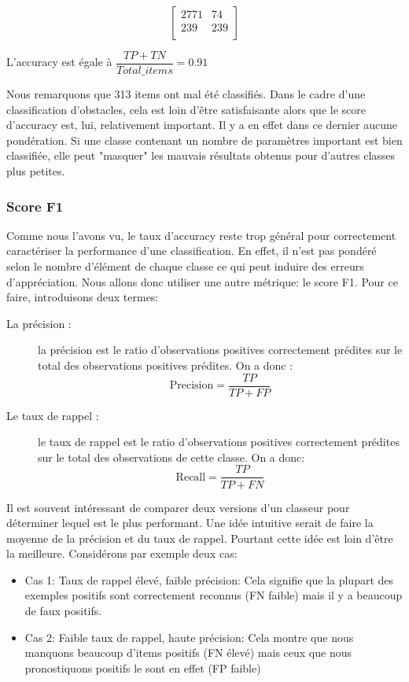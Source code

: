\documentclass[a4paper]{report}
\begin{document}
$$\begin{bmatrix}
2771 & 74 \\ 
239 & 239 \\
\end{bmatrix}$$

\medskip
L’accuracy est égale à $\dfrac{TP+TN}{Total\_items}= 0.91$
\medskip

Nous remarquons que 313 items ont mal été classifiés. Dans le cadre d'une classification d'obstacles, cela est loin d'être satisfaisante alors que le score d'accuracy est, lui, relativement important. Il y a en effet dans ce dernier aucune pondération. Si une classe contenant un nombre de paramètres important est bien classifiée, elle peut "masquer" les mauvais résultats obtenus pour d'autres classes plus petites.

\subsubsection{Score F1}
Comme nous l’avons vu, le taux d’accuracy reste trop général pour correctement caractériser la performance d’une classification. En effet, il n’est pas pondéré selon le nombre d’élément de chaque classe ce qui peut induire des erreurs d’appréciation. Nous allons donc utiliser une autre métrique: le score F1. Pour ce faire, introduisons deux termes:

\begin{description}
\item[La précision :] la précision est le ratio d’observations positives correctement prédites sur le total des observations positives prédites. On a donc : \begin{equation}
\text{Precision} = \dfrac{TP}{TP+FP}
\end{equation}
\item[Le taux de rappel :] le taux de rappel est le ratio d'observations positives correctement prédites sur le total des observations de cette classe. On a donc: \begin{equation}
\text{Recall} = \dfrac{TP}{TP+FN}
\end{equation}
\end{description}

Il est souvent intéressant de comparer deux versions d'un classeur pour déterminer lequel est le plus performant. Une idée intuitive serait de faire la moyenne de la précision et du taux de rappel. Pourtant cette idée est loin d’être la meilleure. Considérons par exemple deux cas:
\begin{itemize}

\item Cas 1: Taux de rappel élevé, faible précision: Cela signifie que la plupart des exemples positifs sont correctement reconnus (FN faible) mais il y a beaucoup de faux positifs.

\item Cas 2: Faible taux de rappel, haute précision: Cela montre que nous manquons beaucoup d’items positifs (FN élevé) mais ceux que nous pronostiquons positifs le sont en effet (FP faible)
\end{itemize}
\end{document}
